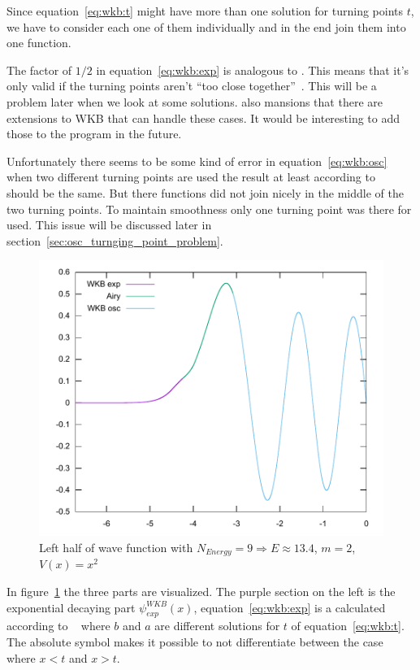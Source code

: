 \documentclass[11pt,DIV=10,final]{scrreprt} %
\begin{document}
{Since equation~\ref{eq:wkb:t} might have more than one solution for turning points $t$, we have to consider each one of them individually and in the end join them into one function.

The factor of $1/2$ in equation~\ref{eq:wkb:exp} is analogous to \citep[eq. 92]{robert2020wkb}. This means that it's only valid if the turning points aren't ``too close together''~\citep{robert2020wkb}.
This will be a problem later when we look at some solutions. \cite{robert2020wkb} also mansions that there are extensions to WKB that can handle these cases. It would be interesting to add those to the
program in the future.

Unfortunately there seems to be some kind of error in equation~\ref{eq:wkb:osc} when two different turning points are used the result at least according to~\cite{hall2013quantum} should be the same.
But there functions did not join nicely in the middle of the two turning points. To maintain smoothness only one turning point was there for used. This issue will be discussed later in
section~\ref{sec:osc_turnging_point_problem}.

\begin{figure}[H]
  \centering
  \includegraphics[width=.9\textwidth]{plots/square9half.pdf}
  \caption{Left half of wave function with $N_{Energy} = 9 \Rightarrow E \approx 13.4$, $m = 2$, $V(x) = x^{2}$}\label{fig:wave_parts}
\end{figure}
In figure~\ref{fig:wave_parts} the three parts are visualized. The purple section on the left is the exponential decaying part $\psi^{WKB}_{exp} (x)$, equation~\ref{eq:wkb:exp} is a calculated according to
~\cite[p. 317, Claim 15.7]{hall2013quantum} where $b$ and $a$ are different solutions for $t$ of equation~\ref{eq:wkb:t}. The absolute symbol makes it possible to not
differentiate between the case where $x < t$ and $x > t$.
}
\end{document}
